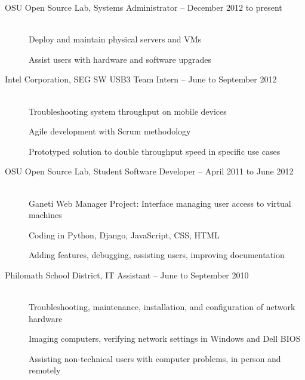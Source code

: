 \documentclass[11pt]{article}
\begin{document}
\begin{description}

\item[OSU Open Source Lab, Systems Administrator -- December 2012 to present]
    \hfill \\
    Deploy and maintain physical servers and VMs

    Assist users with hardware and software upgrades

\item[Intel Corporation, SEG SW USB3 Team Intern -- June to September
2012]
    \hfill \\
    Troubleshooting system throughput on mobile devices

    Agile development with Scrum methodology

    Prototyped solution to double throughput speed in specific use cases

\item[OSU Open Source Lab, Student Software Developer -- April 2011 to June
2012]
    \hfill \\
    Ganeti Web Manager Project: Interface managing user access to
    virtual machines

    Coding in Python, Django, JavaScript, CSS, HTML

    Adding features, debugging, assisting users, improving documentation

\item[Philomath School District, IT Assistant -- June to September 2010]
    \hfill \\
    Troubleshooting, maintenance, installation, and configuration of
    network hardware

    Imaging computers, verifying network settings in Windows and Dell
    BIOS

    Assisting non-technical users with computer problems, in person and
    remotely

\end{description}
\end{document}
